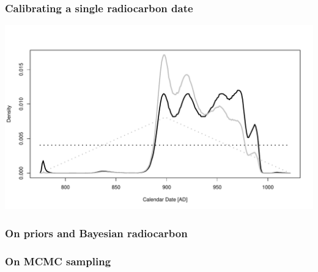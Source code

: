 \documentclass{beamer}
\begin{document}
\begin{frame}[t]
    \frametitle{Calibrating a single radiocarbon date}
    \begin{flushright}
        \includegraphics[width=1\textwidth]{single_date_calibration.pdf}\\
    \end{flushright}
\end{frame}

\begin{frame}[t]
    \frametitle{On priors and Bayesian radiocarbon}
\end{frame}

\begin{frame}[t]
    \frametitle{On MCMC sampling}
\end{frame}
\end{document}
